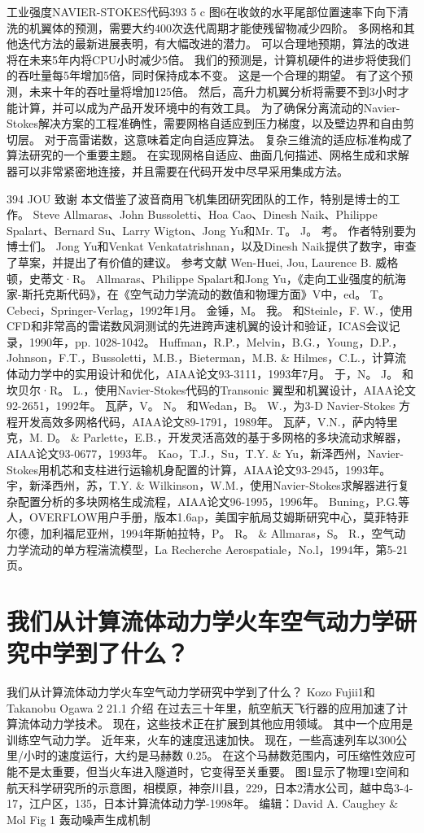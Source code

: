 \documentclass[UTF8,11pt,a4paper,openany,fontset=fandol]{ctexbook}
\begin{document}
工业强度NAVIER-STOKES代码393 5 c 图6在收敛的水平尾部位置速率下向下清洗的机翼体的预测，需要大约400次迭代周期才能使残留物减少四阶。 多网格和其他迭代方法的最新进展表明，有大幅改进的潜力。 可以合理地预期，算法的改进将在未来5年内将CPU小时减少5倍。 我们的预测是，计算机硬件的进步将使我们的吞吐量每5年增加5倍，同时保持成本不变。 这是一个合理的期望。 有了这个预测，未来十年的吞吐量将增加125倍。 然后，高升力机翼分析将需要不到3小时才能计算，并可以成为产品开发环境中的有效工具。 为了确保分离流动的Navier-Stokes解决方案的工程准确性，需要网格自适应到压力梯度，以及壁边界和自由剪切层。 对于高雷诺数，这意味着定向自适应算法。 复杂三维流的适应标准构成了算法研究的一个重要主题。 在实现网格自适应、曲面几何描述、网格生成和求解器可以非常紧密地连接，并且需要在代码开发中尽早采用集成方法。

394 JOU 致谢 本文借鉴了波音商用飞机集团研究团队的工作，特别是博士的工作。 Steve Allmaras、John Bussoletti、Hoa Cao、Dinesh Naik、Philippe Spalart、Bernard Su、Larry Wigton、Jong Yu和Mr. T。 J。 考。 作者特别要为博士们。 Jong Yu和Venkat Venkatatrishnan，以及Dinesh Naik提供了数字，审查了草案，并提出了有价值的建议。 参考文献 Wen-Huei, Jou, Laurence B. 威格顿，史蒂文·R。 Allmaras、Philippe Spalart和Jong Yu，《走向工业强度的航海家-斯托克斯代码》，在《空气动力学流动的数值和物理方面》V中，ed。 T。 Cebeci，Springer-Verlag，1992年1月。 金锤，M。 我。 和Steinle，F. W.，使用CFD和非常高的雷诺数风洞测试的先进跨声速机翼的设计和验证，ICAS会议记录，1990年，pp. 1028-1042。 Huffman，R.P.，Melvin，B.G.，Young，D.P.，Johnson，F.T.，Bussoletti，M.B.，Bieterman，M.B. \& Hilmes，C.L.，计算流体动力学中的实用设计和优化，AIAA论文93-3111，1993年7月。 于，N。 J。 和坎贝尔·R。 L.，使用Navier-Stokes代码的Transonic 翼型和机翼设计，AIAA论文92-2651，1992年。 瓦萨，V。 N。 和Wedan，B。 W.，为3-D Navier-Stokes 方程开发高效多网格代码，AIAA论文89-1791，1989年。 瓦萨，V.N.，萨内特里克，M. D。 \& Parlette，E.B.，开发灵活高效的基于多网格的多块流动求解器，AIAA论文93-0677，1993年。 Kao，T.J.，Su，T.Y. \& Yu，新泽西州，Navier-Stokes用机芯和支柱进行运输机身配置的计算，AIAA论文93-2945，1993年。 宇，新泽西州，苏，T.Y. \& Wilkinson，W.M.，使用Navier-Stokes求解器进行复杂配置分析的多块网格生成流程，AIAA论文96-1995，1996年。 Buning，P.G.等人，OVERFLOW用户手册，版本1.6ap，美国宇航局艾姆斯研究中心，莫菲特菲尔德，加利福尼亚州，1994年斯帕拉特，P。 R。 \& Allmaras，S。 R.，空气动力学流动的单方程湍流模型，La Recherche Aerospatiale，No.l，1994年，第5-21页。

\clearpage
\chapter{我们从计算流体动力学火车空气动力学研究中学到了什么？}
我们从计算流体动力学火车空气动力学研究中学到了什么？ Kozo Fujii1和Takanobu Ogawa 2 21.1 介绍 在过去三十年里，航空航天飞行器的应用加速了计算流体动力学技术。 现在，这些技术正在扩展到其他应用领域。 其中一个应用是训练空气动力学。 近年来，火车的速度迅速加快。 现在，一些高速列车以300公里/小时的速度运行，大约是马赫数 0.25。 在这个马赫数范围内，可压缩性效应可能不是太重要，但当火车进入隧道时，它变得至关重要。 图1显示了物理1空间和航天科学研究所的示意图，相模原，神奈川县，229，日本2清水公司，越中岛3-4-17，江户区，135，日本计算流体动力学-1998年。 编辑：David A. Caughey \& Mol Fig 1 轰动噪声生成机制
\end{document}
